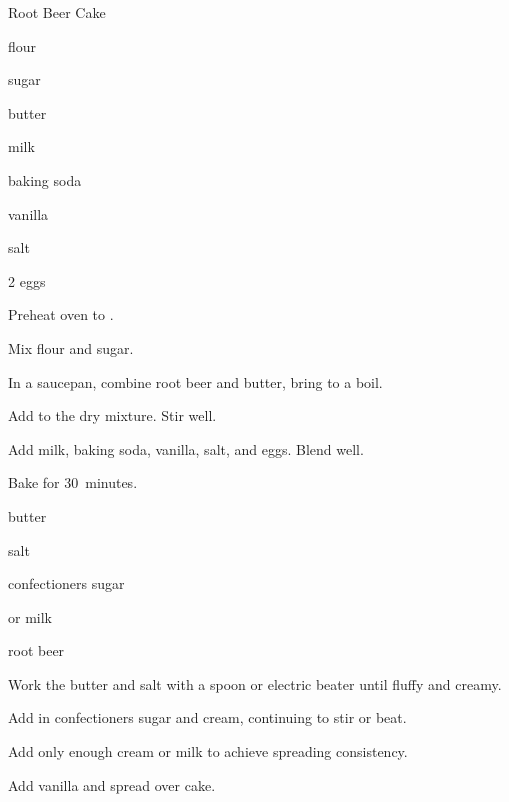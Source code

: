 \begin{recipe}{Root Beer Cake}{}{}

\begin{ingredients}
\item {} flour
\item {} sugar
\item {} 
\item {} butter
\item \C{\half} milk
\item {} baking soda
\item {} vanilla
\item \tp{\half} salt
\item 2 eggs
\end{ingredients}

\begin{directions}
\item Preheat oven to .
\item Mix flour and sugar.
\item In a saucepan, combine root beer and butter, bring to a boil.
\item Add to the dry mixture.  Stir well.
\item Add milk, baking soda, vanilla, salt, and eggs. Blend well.
\item Bake for 30~minutes. 
\end{directions}


\begin{ingredients}
\item \C{\quarter} butter
\item \tp{\eighth} salt
\item {} confectioners sugar
\item {}  or milk
\item {} root beer
\end{ingredients}

\begin{directions}
\item Work the butter and salt with a spoon or electric beater until fluffy and creamy.
\item Add in confectioners sugar and cream, continuing to stir or beat.
\item Add only enough cream or milk to achieve spreading consistency.
\item Add vanilla and spread over cake.
\end{directions}
\end{recipe}
